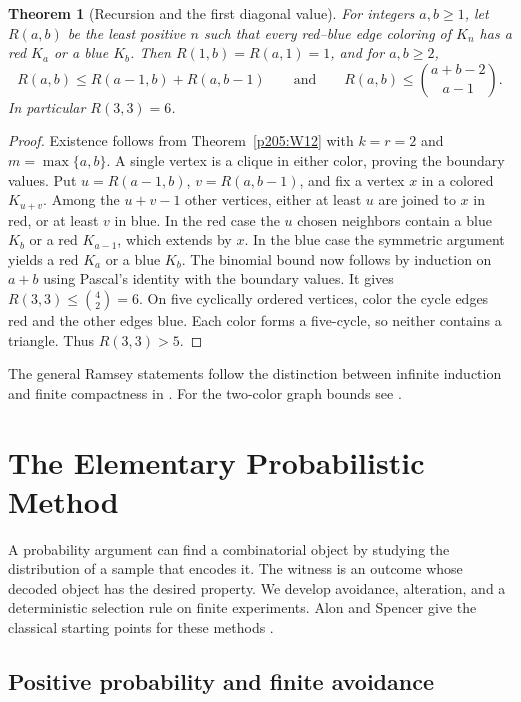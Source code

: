 \documentclass[11pt,oneside,openany]{book}
\theoremstyle{plain}
\newtheorem{theorem}{Theorem}[chapter]
\theoremstyle{definition}
\theoremstyle{remark}
\begin{document}
\begin{theorem}[Recursion and the first diagonal value]\label{p205:W13}
For integers \(a,b\ge1\), let \(R(a,b)\) be the least positive \(n\)
such that every red--blue edge coloring of \(K_n\) has a red \(K_a\)
or a blue \(K_b\). Then \(R(1,b)=R(a,1)=1\), and for \(a,b\ge2\),
\[
 R(a,b)\le R(a-1,b)+R(a,b-1)
    \qquad\text{and}\qquad
 R(a,b)\le\binom{a+b-2}{a-1}.
\]
In particular \(R(3,3)=6\).
\end{theorem}
\begin{proof}
Existence follows from Theorem~\ref{p205:W12} with \(k=r=2\)
and \(m=\max\{a,b\}\). A single vertex is a clique in either
color, proving the boundary values. Put \(u=R(a-1,b)\),
\(v=R(a,b-1)\), and fix a vertex \(x\) in a colored \(K_{u+v}\).
Among the \(u+v-1\) other vertices, either at least \(u\) are
joined to \(x\) in red, or at least \(v\) in blue. In the red case
the \(u\) chosen neighbors contain a blue \(K_b\) or a red
\(K_{a-1}\), which extends by \(x\). In the blue case the symmetric
argument yields a red \(K_a\) or a blue \(K_b\).
The binomial bound now follows by induction on \(a+b\) using
Pascal's identity with the boundary values. It gives
\(R(3,3)\le\binom42=6\). On five cyclically ordered vertices, color
the cycle edges red and the other edges blue. Each color forms a
five-cycle, so neither contains a triangle. Thus \(R(3,3)>5\).
\end{proof}

The general Ramsey statements follow the distinction between infinite
induction and finite compactness in \cite[Section~9.1]{diestel}.
For the two-color graph bounds see \cite[Section~4.9]{jukna}.
\chapter[Elementary Probabilistic Method]{The Elementary Probabilistic Method}
\label{p205:probabilistic}

A probability argument can find a combinatorial object by studying the
distribution of a sample that encodes it. The witness is an outcome whose
decoded object has the desired property. We develop avoidance, alteration,
and a deterministic selection rule on finite experiments. Alon and Spencer
give the classical starting points for these methods \cite{alon}.

\section{Positive probability and finite avoidance}
\end{document}
